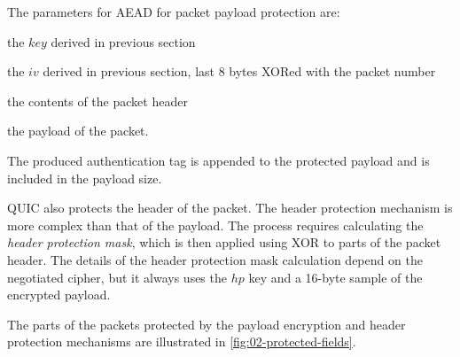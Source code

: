 The parameters for AEAD for packet payload protection are:

\begin{itemize}

     the $key$ derived in previous section

     the $iv$ derived in previous section, last 8 bytes XORed with the packet number

     the contents of the packet header

     the payload of the packet.

\end{itemize}

The produced authentication tag is appended to the protected payload and is included in the payload
size.

QUIC also protects the header of the packet. The header protection mechanism is more complex than
that of the payload. The process requires calculating the \textit{header protection mask}, which is
then applied using XOR to parts of the packet header. The details of the header protection mask
calculation depend on the negotiated cipher, but it always uses the $hp$ key and a 16-byte sample of
the encrypted payload.

The parts of the packets protected by the payload encryption and header
protection mechanisms are illustrated in \autoref{fig:02-protected-fields}.


